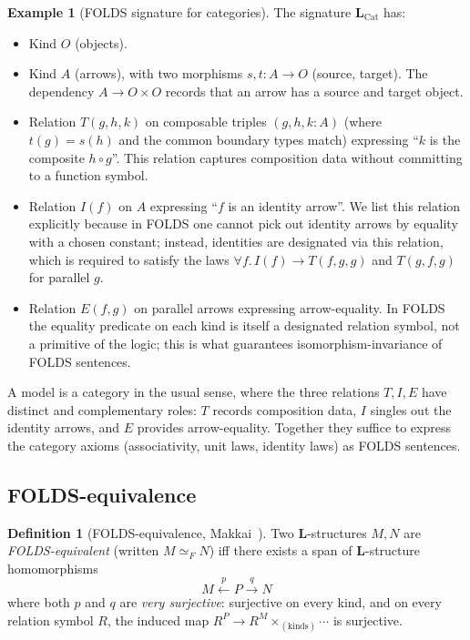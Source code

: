 \documentclass[12pt]{article}
\theoremstyle{definition}
\newtheorem{definition}[theorem]{Definition}
\newtheorem{example}[theorem]{Example}
\theoremstyle{remark}
\begin{document}
\begin{example}[FOLDS signature for categories]
\label{ex:foldscat}
The signature $\mathbf{L}_{\mathrm{Cat}}$ has:
\begin{itemize}
\item Kind $O$ (objects).
\item Kind $A$ (arrows), with two morphisms $s,t: A\to O$ (source, target). The
dependency $A\to O\times O$ records that an arrow has a source and target object.
\item Relation $T(g,h,k)$ on composable triples $(g, h, k:A)$ (where $t(g)=s(h)$ and the
common boundary types match) expressing ``$k$ is the composite $h\circ g$''. This
relation captures composition data without committing to a function symbol.
\item Relation $I(f)$ on $A$ expressing ``$f$ is an identity arrow''. We list this
relation explicitly because in FOLDS one cannot pick out identity arrows by equality
with a chosen constant; instead, identities are designated via this relation, which is
required to satisfy the laws $\forall f.\, I(f)\to T(f,g,g)$ and $T(g,f,g)$ for parallel
$g$.
\item Relation $E(f,g)$ on parallel arrows expressing arrow-equality. In FOLDS the
equality predicate on each kind is itself a designated relation symbol, not a primitive
of the logic; this is what guarantees isomorphism-invariance of FOLDS sentences.
\end{itemize}
A model is a category in the usual sense, where the three relations $T, I, E$ have
distinct and complementary roles: $T$ records composition data, $I$ singles out the
identity arrows, and $E$ provides arrow-equality. Together they suffice to express the
category axioms (associativity, unit laws, identity laws) as FOLDS sentences.
\end{example}

\subsection{FOLDS-equivalence}

\begin{definition}[FOLDS-equivalence, Makkai~\cite{Makkai1995}]
\label{def:foldsequiv}
Two $\mathbf{L}$-structures $M, N$ are \emph{FOLDS-equivalent} (written $M\simeq_F N$)
iff there exists a span of $\mathbf{L}$-structure homomorphisms
\[
M \xleftarrow{p} P \xrightarrow{q} N
\]
where both $p$ and $q$ are \emph{very surjective}: surjective on every kind, and on every
relation symbol $R$, the induced map $R^P \to R^M\times_{(\text{kinds})} \cdots$ is
surjective.
\end{definition}
\end{document}
